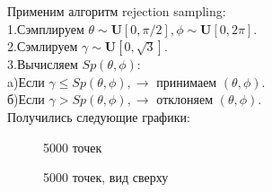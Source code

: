 \documentclass{article}
\begin{document}
Применим алгоритм rejection sampling:\\
1.Сэмплируем $\theta \sim \mathbf{U}[0,\pi/2], \phi \sim \mathbf{U}[0,2\pi]$.\\
2.Сэмлируем $\gamma \sim \mathbf{U}[0, \sqrt{3}]$.\\
3.Вычисляем $Sp(\theta,\phi)$:\\
a)Если $\gamma \leq Sp(\theta,\phi), \to $ принимаем $(\theta, \phi)$.\\
б)Если $\gamma > Sp(\theta, \phi), \to $ отклоняем $(\theta, \phi)$.\\

Получились следующие графики:
\begin{figure}[h]
\caption{5000 точек}
\label{ris:image}
\end{figure}

\begin{figure}[h]
\caption{5000 точек, вид сверху}
\label{ris:image}
\end{figure}
\end{document}
